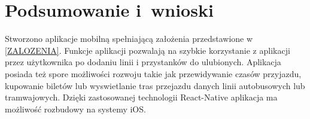 \documentclass{SGGW-thesis}
\begin{document}
\chapter{Podsumowanie i~wnioski}
Stworzono aplikacje mobilną spełniającą założenia przedstawione w \ref{ZALOZENIA}.
Funkcje aplikacji pozwalają na szybkie korzystanie z aplikacji przez użytkownika po dodaniu linii i przystanków do ulubionych.
Aplikacja posiada też spore możliwości rozwoju takie jak przewidywanie czasów przyjazdu, kupowanie biletów lub wyswietlanie tras przejazdu danych linii autobusowych lub tramwajowych.
Dzięki zastosowanej technologii React-Native aplikacja ma możliwość rozbudowy na systemy iOS.



\begin{thebibliography}{9}

\end{thebibliography}

\beforelastpage
\end{document}
